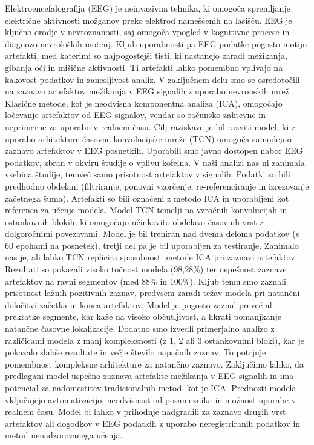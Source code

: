 \documentclass[12pt,a4paper,titlepage,openany]{report}
\begin{document}
Elektroencefalografija (EEG) je neinvazivna tehnika, ki omogoča spremljanje električne aktivnosti možganov preko elektrod nameščenih na lasišču. EEG je ključno orodje v nevroznanosti, saj omogoča vpogled v kognitivne procese in diagnozo nevroloških motenj. Kljub uporabnosti pa EEG podatke pogosto motijo artefakti, med katerimi so najpogostejši tisti, ki nastanejo zaradi mežikanja, gibanja oči in mišične aktivnosti. Ti artefakti lahko pomembno vplivajo na kakovost podatkov in zanesljivost analiz.
V zaključnem delu smo se osredotočili na zaznavo artefaktov mežikanja v EEG signalih z uporabo nevronskih mrež. Klasične metode, kot je neodvisna komponentna analiza (ICA), omogočajo ločevanje artefaktov od EEG signalov, vendar so računsko zahtevne in neprimerne za uporabo v realnem času. Cilj raziskave je bil razviti model, ki z uporabo arhitekture časovne konvolucijske mreže (TCN) omogoča samodejno zaznavo artefaktov v EEG posnetkih.
Uporabili smo javno dostopen nabor EEG podatkov, zbran v okviru študije o vplivu kofeina. V naši analizi nas ni zanimala vsebina študije, temveč samo prisotnost artefaktov v signalih. Podatki so bili predhodno obdelani (filtriranje, ponovni vzorčenje, re-referenciranje in izrezovanje začetnega šuma). Artefakti so bili označeni z metodo ICA in uporabljeni kot referenca za učenje modela.
Model TCN temelji na vzročnih konvolucijah in ostankovnih blokih, ki omogočajo učinkovito obdelavo časovnih vrst z dolgoročnimi povezavami. Model je bil treniran nad dvema deloma podatkov (s 60 epohami na posnetek), tretji del pa je bil uporabljen za testiranje. Zanimalo nas je, ali lahko TCN replicira sposobnosti metode ICA pri zaznavi artefaktov.
Rezultati so pokazali visoko točnost modela (98,28\%) ter uspešnost zaznave artefaktov na ravni segmentov (med 88\% in 100\%). Kljub temu smo zaznali prisotnost lažnih pozitivnih zaznav, predvsem zaradi težav modela pri natančni določitvi začetka in konca artefaktov. Model je pogosto zaznal preveč ali prekratke segmente, kar kaže na visoko občutljivost, a hkrati pomanjkanje natančne časovne lokalizacije.
Dodatno smo izvedli primerjalno analizo z različicami modela z manj kompleksnosti (z 1, 2 ali 3 ostankovnimi bloki), kar je pokazalo slabše rezultate in večje število napačnih zaznav. To potrjuje pomembnost kompleksne arhitekture za natančno zaznavo.
Zaključimo lahko, da predlagani model uspešno zaznava artefakte mežikanja v EEG signalih in ima potencial za nadomestitev tradicionalnih metod, kot je ICA. Prednosti modela vključujejo avtomatizacijo, neodvisnost od posameznika in možnost uporabe v realnem času. Model bi lahko v prihodnje nadgradili za zaznavo drugih vrst artefaktov ali dogodkov v EEG podatkih z uporabo neregistriranih podatkov in metod nenadzorovanega učenja.


\end{document}
